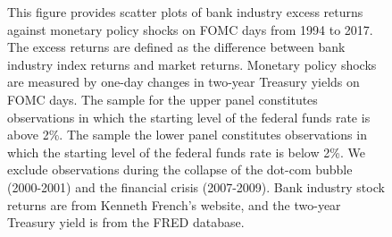 \documentclass[12pt]{article}
\begin{document}
\begin{figure}[h]
\begin{centering}
	\end{centering}
	{\footnotesize{This figure provides scatter plots of bank industry excess returns against monetary policy shocks on FOMC days from 1994 to 2017. The excess  returns are defined as the difference between bank industry index returns and market returns. Monetary policy shocks are measured by one-day changes in two-year Treasury yields on FOMC days.
			The sample for the upper panel constitutes observations in which the starting level of the federal funds rate is above 2\%. The sample the lower panel constitutes observations in which the starting level of the federal funds rate is below 2\%.  We exclude observations during the collapse of the dot-com bubble (2000-2001) and the financial crisis (2007-2009).   Bank industry stock returns are  from Kenneth French's website, and the two-year Treasury yield is  from the FRED database.}}
\end{figure}
\end{document}
